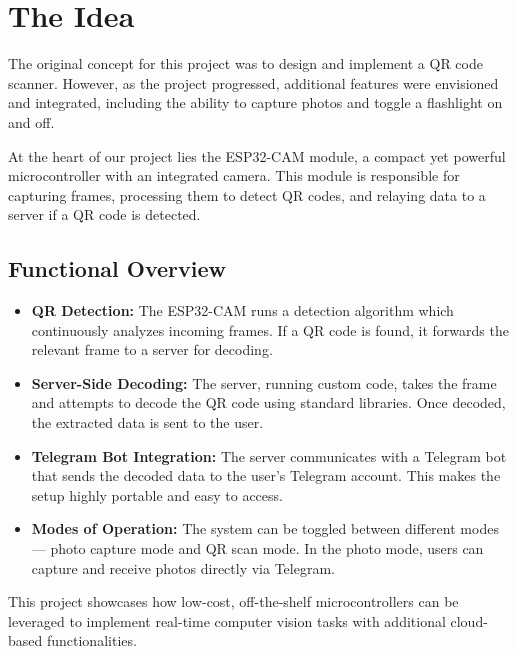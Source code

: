 \chapter{The Idea}

The original concept for this project was to design and implement a QR code scanner. However, as the project progressed, additional features were envisioned and integrated, including the ability to capture photos and toggle a flashlight on and off.

At the heart of our project lies the ESP32-CAM module, a compact yet powerful microcontroller with an integrated camera. This module is responsible for capturing frames, processing them to detect QR codes, and relaying data to a server if a QR code is detected.

\section*{Functional Overview}

\begin{itemize}
    \item \textbf{QR Detection:} The ESP32-CAM runs a detection algorithm which continuously analyzes incoming frames. If a QR code is found, it forwards the relevant frame to a server for decoding.
    \item \textbf{Server-Side Decoding:} The server, running custom code, takes the frame and attempts to decode the QR code using standard libraries. Once decoded, the extracted data is sent to the user.
    \item \textbf{Telegram Bot Integration:} The server communicates with a Telegram bot that sends the decoded data to the user's Telegram account. This makes the setup highly portable and easy to access.
    \item \textbf{Modes of Operation:} The system can be toggled between different modes — photo capture mode and QR scan mode. In the photo mode, users can capture and receive photos directly via Telegram.
\end{itemize}

This project showcases how low-cost, off-the-shelf microcontrollers can be leveraged to implement real-time computer vision tasks with additional cloud-based functionalities.
